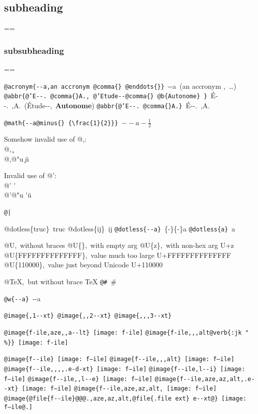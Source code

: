 \documentclass{book}
\makeatletter
\newenvironment{Texinfopreformatted}{%
  \par\GNUTobeylines\obeyspaces\frenchspacing\parskip=\z@\parindent=\z@}{}
{\catcode`\^^M=13 \gdef\GNUTobeylines{\catcode`\^^M=13 \def^^M{\null\par}}}
\newenvironment{Texinfoindented}{\begin{list}{}{}\item\relax}{\end{list}}
\renewcommand{\_}{\Texinfounderscore\discretionary{}{}{}}
\renewcommand{\includegraphics}[1]{\fbox{FIG \detokenize{#1}}}
\makeatother
\begin{document}
\begin{Texinfoindented}
\subsection*{{subheading}}
\begin{Texinfopreformatted}%
\ttfamily 
\end{Texinfopreformatted}
\subsubsection*{{subsubheading}}
\begin{Texinfopreformatted}%
\ttfamily 

\texttt{@acronym\{{-}{-}a,an accronym @comma\{\}\ @enddots\{\}\}}\ {-}{-}a\ (an accronym ,\ \dots{})
\texttt{@abbr\{@'E{-}{-}.\ @comma\{\}A.,\ @'Etude{-}{-}@comma\{\}\ @b\{Autonome\}\ \}}\ \'{E}{-}{-}.\@\ ,A.\@\ (\'{E}tude{-}{-},\ \textbf{Autonome})
\texttt{@abbr\{@'E{-}{-}.\ @comma\{\}A.\}}\ \'{E}{-}{-}.\@\ ,A.\@

\texttt{@math\{{-}{-}a@minus\{\}\ \{\textbackslash{}frac\{1\}\{2\}\}\}}\ $--a- {\frac{1}{2}}$




Somehow invalid use of @,:\leavevmode{}\\
@,\ \c{}\leavevmode{}\\
@,@"u \c{}\"{u}

Invalid use of @':\leavevmode{}\\
@' \'{}\leavevmode{}\\
@'@"u \'{}\"{u}

\texttt{@|}\ 

@dotless\{truc\}\ truc
@dotless\{ij\}\ ij
\texttt{@dotless\{{-}{-}a\}}\ \{-\}\{-\}a
\texttt{@dotless\{a\}}\ a

@U,\ without braces @U\{\},\ with empty arg 
@U\{z\},\ with non-hex arg U+z
@U\{FFFFFFFFFFFFFF\},\ value much too large U+FFFFFFFFFFFFFF
@U\{110000\},\ value just beyond Unicode U+110000

@TeX,\ but without brace \TeX{}
\texttt{@\#}\ \#

\texttt{@w\{{-}{-}a\}}\ \hbox{{-}{-}a}

\texttt{@image\{,1{-}{-}xt\}}\ 
\texttt{@image\{{,}{,}2{-}{-}xt\}}\ 
\texttt{@image\{{,}{,},3{-}{-}xt\}}\ 

\texttt{@image\{f-ile,aze{,}{,}a{-}{-}lt\}}\ \texttt{[image: f-ile]}
\texttt{@image\{f-ile{,}{,},alt@verb\{:jk \_" \%\@\}\}}\ \texttt{[image: f-ile]}

\texttt{@image\{f{-}{-}ile\}}\ \texttt{[image: f--ile]}
\texttt{@image\{f{-}{-}ile{,}{,},alt\}}\ \texttt{[image: f--ile]}
\texttt{@image\{f{-}{-}ile{,}{,}{,}{,}.e-d-xt\}}\ \texttt{[image: f--ile]}
\texttt{@image\{f{-}{-}ile,l{-}{-}i\}}\ \texttt{[image: f--ile]}
\texttt{@image\{f{-}{-}ile{,}{,}l{-}{-}e\}}\ \texttt{[image: f--ile]}
\texttt{@image\{f{-}{-}ile,aze,az,alt,.e{-}{-}xt\}}\ \texttt{[image: f--ile]}
\texttt{@image\{f{-}{-}ile,aze,az,alt,}\ \texttt{[image: f--ile]}
\texttt{@image\{@file\{f{-}{-}ile\}@@@.,aze,az,alt,@file\{.file ext\}\ e{-}{-}xt@\}}\ \texttt{[image: f--ile@.]}


\end{Texinfopreformatted}
\end{Texinfoindented}
\end{document}

